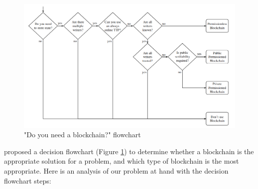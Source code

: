 \begin{figure}[!ht] 
    \centering    
    \includegraphics[width=1.0\textwidth]{blockchain_need}
    \caption["Do you need a blockchain?" flowchart]
        {"Do you need a blockchain?" flowchart \citep[p.3]{wust2017you}}
    \label{fig:blockchain_need}
\end{figure}

\citet[p.3]{wust2017you} proposed a decision flowchart (Figure \ref{fig:blockchain_need}) to determine whether a blockchain is 
the appropriate solution for a problem, and which type of blockchain is the most appropriate. Here is an analysis of our problem at 
hand with the decision flowchart steps:

